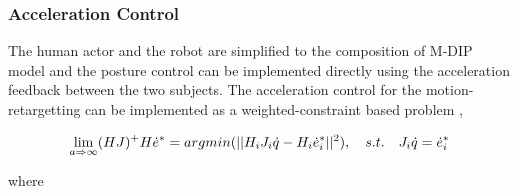 \subsubsection{Acceleration Control}

The human actor and the robot are simplified to the composition of M-DIP model and the posture control can be implemented directly using the acceleration feedback between the 
two subjects. The acceleration control for the motion-retargetting can be implemented as a weighted-constraint based problem \cite{van1985method},

\begin{equation}
    \label{eq: MDIP-control}
    \lim_{a \Rightarrow \infty} (HJ)^+ H\dot{e}^* = argmin (||H_iJ_i\dot{q} - H_i\dot{e}^*_i||^2), \quad \mathnormal{s.t. \quad J_i\dot{q} = \dot{e}_i^*}
\end{equation}


where 

